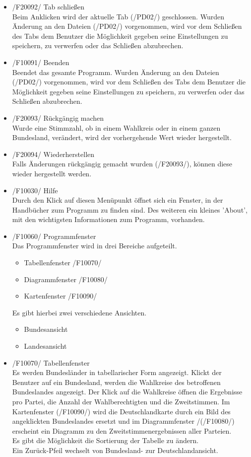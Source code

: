 \documentclass[10pt,a4paper]{article}
\begin{document}
\begin{itemize}
	\item /F20092/ Tab schließen \hfill \\
	Beim Anklicken wird der aktuelle Tab (/PD02/) geschlossen. Wurden Änderung an den Dateien (/PD02/) vorgenommen, wird vor dem Schließen des Tabs dem Benutzer die Möglichkeit gegeben seine Einstellungen zu speichern, zu verwerfen 
	oder das Schließen abzubrechen.
	\item /F10091/ Beenden \hfill \\
	Beendet das gesamte Programm. Wurden Änderung an den Dateien (/PD02/) vorgenommen, wird vor dem Schließen des Tabs dem Benutzer die Möglichkeit gegeben seine Einstellungen zu speichern, zu verwerfen 
	oder das Schließen abzubrechen.
	\item /F20093/ Rückgängig machen \hfill \\
	Wurde eine Stimmzahl, ob in einem Wahlkreis oder in einem ganzen Bundesland, verändert, wird der vorhergehende Wert wieder hergestellt.
	\item /F20094/ Wiederherstellen \hfill \\
	Falls Änderungen rückgängig gemacht wurden (/F20093/), können diese wieder hergestellt werden.
	
	\item /F10030/ Hilfe \hfill \\
	Durch den Klick auf diesen Menüpunkt öffnet sich ein Fenster, in der Handbücher zum Programm zu finden sind. Des weiteren ein kleines 'About', mit den wichtigsten Informationen zum Programm, vorhanden.
	
	\item /F10060/ Programmfenster \hfill \\
	Das Programmfenster wird in drei Bereiche aufgeteilt.
	\begin{itemize}
		\item Tabellenfenster /F10070/
		\item Diagrammfenster /F10080/
		\item Kartenfenster /F10090/
	\end{itemize}
	Es gibt hierbei zwei verschiedene Ansichten.
	\begin{itemize}
		\item Bundesansicht
		\item Landesansicht
	\end{itemize}
	\item /F10070/ Tabellenfenster \hfill \\
	Es werden Bundesländer in tabellarischer Form angezeigt. Klickt der Benutzer auf ein Bundesland, werden die Wahlkreise des betroffenen Bundeslandes angezeigt. Der Klick auf die Wahlkreise öffnen die Ergebnisse pro Partei, die Anzahl der Wahlberechtigten und die Zweitstimmen. Im Kartenfenster (/F10090/) wird die Deutschlandkarte durch ein Bild des angeklickten Bundeslandes ersetzt und im Diagrammfenster /(/F10080/) erscheint ein Diagramm zu den Zweitstimmenergebnissen aller Parteien. \\
	Es gibt die Möglichkeit die Sortierung der Tabelle zu ändern. \\
	Ein Zurück-Pfeil wechselt von Bundesland- zur Deutschlandansicht.
	

\end{itemize}
\end{document}
